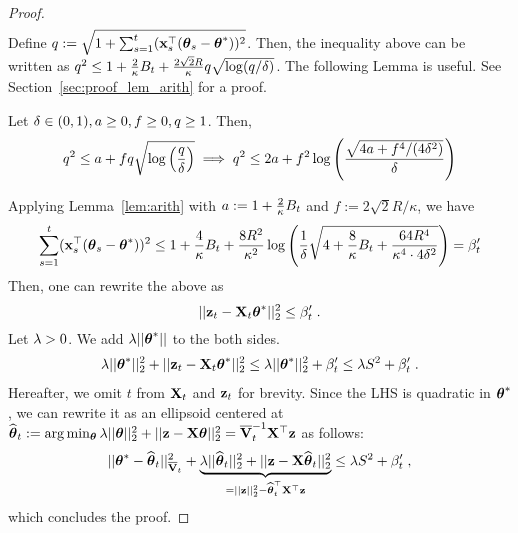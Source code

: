 \begin{proof}
\begin{equation*}
\begin{aligned}
  \end{aligned}\end{equation*}
  Define $q := \sqrt{1 + \sum_{s=1}^t (\mathbf{x}_s^{\top}({{\boldsymbol \theta}}_s-{{\boldsymbol \theta}}^*))^2}$. Then, the inequality above can be written as $ q^2 \le 1+ { \frac{2}{\kappa} }B_t + { \frac{2\sqrt{2} R}{\kappa} } q \sqrt{\log(q/{\delta})} $.
%
  The following Lemma is useful. See Section~\ref{sec:proof_lem_arith} for a proof.
  \vspace{-4pt}
  \begin{lem}\label{lem:arith}
    Let ${\delta}\in(0,1), a \ge 0, f \ge 0, q \ge 1$.
    Then, 
    \[
      q^2 \le a + f q \sqrt{\log\left({ \frac{q}{{\delta}} }\right)} 
      \implies q^2 \le 2a + f^2\log\left({ \frac{\sqrt{4a + f^4/(4{\delta}^2)}}{{\delta}} }\right)
    \]
  \end{lem}
  \vspace{-4pt}
  Applying Lemma~\ref{lem:arith} with $a := 1+ { \frac{2}{\kappa} }B_t$ and $f := 2\sqrt{2}R/\kappa$, we have
  \vspace{-4pt}
  \begin{equation*}\begin{aligned}
      \sum_{s=1}^t(\mathbf{x}_s^{\top}({{\boldsymbol \theta}}_s-{{\boldsymbol \theta}}^*))^2 \le 1 + { \frac{4}{\kappa} }B_t + { \frac{8R^2}{\kappa^2} } \log\left({ \frac{1}{{\delta}} }\sqrt{ 4+ { \frac{8}{\kappa} }B_t + { \frac{64R^4}{\kappa^4\cdot 4{\delta}^2} } } \right)  = \beta'_t
  \end{aligned}\end{equation*} %
  Then, one can rewrite the above as
  \begin{equation*}
    || {{\mathbf z}}_{t} - \mathbf{X}_{t}{{\boldsymbol \theta}}^* ||^2_2 \le \beta'_t \;.
  \end{equation*}
  Let ${\lambda} >0$.
  We add ${\lambda} ||{{\boldsymbol \theta}}^*||$ to the both sides. %
  \begin{equation*}\begin{aligned}
      {\ensuremath{\lambda}} ||{{\boldsymbol \theta}}^*||^2_2 + || {{\mathbf z}}_{t} - \mathbf{X}_{t}{{\boldsymbol \theta}}^* ||^2_2 \le {\ensuremath{\lambda}} ||{{\boldsymbol \theta}}^*||^2_2 + \beta'_t \le {\ensuremath{\lambda}} S^2 + \beta'_t \;.
  \end{aligned}\end{equation*}
  Hereafter, we omit $t$ from $\mathbf{X}_t $ and ${{\mathbf z}}_t $ for brevity.
  Since the LHS is quadratic in ${{\boldsymbol \theta}}^*$, we can rewrite it as an ellipsoid centered at ${{\widehat{\boldsymbol \theta}}}_t := \arg\min_{{{\boldsymbol \theta}}} {\lambda} ||{{\boldsymbol \theta}}||^2_2 + ||{{\mathbf z}}  - \mathbf{X} {{\boldsymbol \theta}}||^2_2 = \overline{\mathbf{V}}^{-1}_t\mathbf{X}^{\top} {{\mathbf z}}$ as follows:
  \begin{equation*}\begin{aligned}
     ||{{\boldsymbol \theta}}^* - {{\widehat{\boldsymbol \theta}}}_t||^2_{\overline{\mathbf{V}}_t} + \underbrace{{\lambda} ||{{\widehat{\boldsymbol \theta}}}_t||^2_2 + ||{{\mathbf z}}  - \mathbf{X} {{\widehat{\boldsymbol \theta}}}_t ||^2_2}_{= ||{{\mathbf z}} ||^2_2 - {{\widehat{\boldsymbol \theta}}}_t^{\top}\mathbf{X}^{\top}{{\mathbf z}} } \le {\ensuremath{\lambda}} S^2 + \beta'_t \;,
  \end{aligned}\end{equation*}
  which concludes the proof.
\end{proof}

